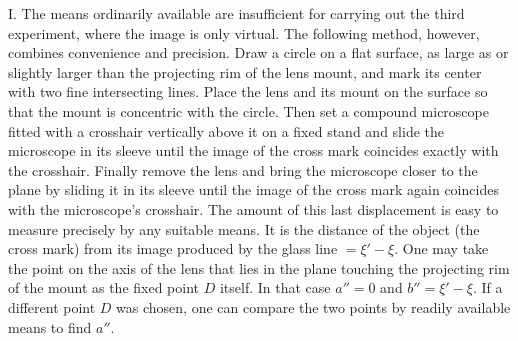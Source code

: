 I. The means ordinarily available are insufficient for carrying out the third experiment, where the image is only virtual. The following method, however, combines convenience and precision. Draw a circle on a flat surface, as large as or slightly larger than the projecting rim of the lens mount, and mark its center with two fine intersecting lines. Place the lens and its mount on the surface so that the mount is concentric with the circle. Then set a compound microscope fitted with a crosshair vertically above it on a fixed stand and slide the microscope in its sleeve until the image of the cross mark coincides exactly with the crosshair. Finally remove the lens and bring the microscope closer to the plane by sliding it in its sleeve until the image of the cross mark again coincides with the microscope's crosshair. The amount of this last displacement is easy to measure precisely by any suitable means. It is the distance of the object (the cross mark) from its image produced by the glass line $=\xi'-\xi$. One may take the point on the axis of the lens that lies in the plane touching the projecting rim of the mount as the fixed point $D$ itself. In that case $a''=0$ and $b''=\xi'-\xi$. If a different point $D$ was chosen, one can compare the two points by readily available means to find $a''$.

